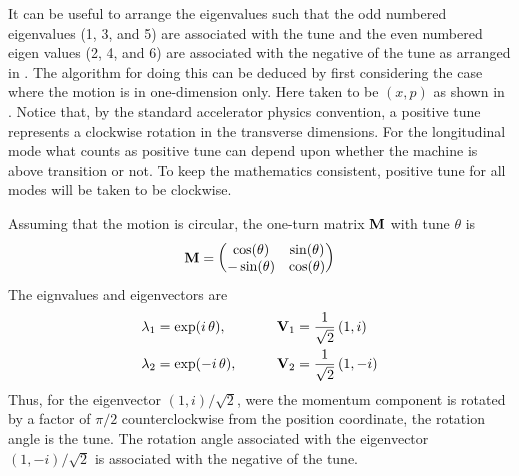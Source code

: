 It can be useful to arrange the eigenvalues such that the odd numbered eigenvalues (1, 3, and 5) are
associated with the tune and the even numbered eigen values (2, 4, and 6) are associated with the
negative of the tune as arranged in . The algorithm for doing this can be deduced by first
considering the case where the motion is in one-dimension only. Here taken to be $(x, p)$ as shown
in . Notice that, by the standard accelerator physics convention, a positive tune
represents a clockwise rotation in the transverse dimensions. For the longitudinal mode what counts
as positive tune can depend upon whether the machine is above transition or not. To keep the
mathematics consistent, positive tune for all modes will be taken to be clockwise.

Assuming that the motion is circular, the one-turn matrix ${\bf M}$ with tune $\theta$ is
\begin{equation}
  {\bf M} = \begin{pmatrix}
    \cos(\theta) & \sin(\theta) \\
   -\sin(\theta) & \cos(\theta)
  \end{pmatrix}
  \label{mctst}
\end{equation}
The eignvalues and eigenvectors are
\begin{alignat}{2}
  \lambda_1 &= \exp( i \, \theta),  \qquad &&{\bf V}_1 = \frac{1}{\sqrt{2}} \, (1, i) \nonumber \\
  \lambda_2 &= \exp(-i \, \theta),  \qquad &&{\bf V}_2 = \frac{1}{\sqrt{2}} \, (1, -i) 
\end{alignat}
Thus, for the eigenvector $(1, i)/\sqrt{2}$, were the momentum component is rotated by a factor
of $\pi/2$ counterclockwise from the position coordinate, the rotation angle is the tune. The
rotation angle associated with the eigenvector $(1, -i)/\sqrt{2}$ is associated with the negative of
the tune.


